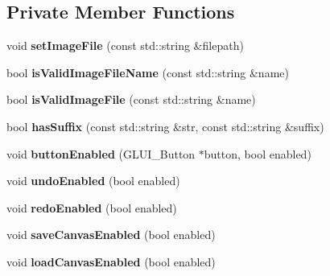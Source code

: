 \subsection*{Private Member Functions}
\begin{DoxyCompactItemize}
\item 
void {\bfseries set\+Image\+File} (const std\+::string \&filepath)\hypertarget{classFlashPhotoApp_a262d3fad41e5feb441b4ea431c65f8c1}{}\label{classFlashPhotoApp_a262d3fad41e5feb441b4ea431c65f8c1}

\item 
bool {\bfseries is\+Valid\+Image\+File\+Name} (const std\+::string \&name)\hypertarget{classFlashPhotoApp_a05fb136c74949eb11f07f161e18b0e44}{}\label{classFlashPhotoApp_a05fb136c74949eb11f07f161e18b0e44}

\item 
bool {\bfseries is\+Valid\+Image\+File} (const std\+::string \&name)\hypertarget{classFlashPhotoApp_af9f413e89445c3a0210e69d542affd67}{}\label{classFlashPhotoApp_af9f413e89445c3a0210e69d542affd67}

\item 
bool {\bfseries has\+Suffix} (const std\+::string \&str, const std\+::string \&suffix)\hypertarget{classFlashPhotoApp_a346a7760598d8dd3c6ddb0630b1e51b6}{}\label{classFlashPhotoApp_a346a7760598d8dd3c6ddb0630b1e51b6}

\item 
void {\bfseries button\+Enabled} (G\+L\+U\+I\+\_\+\+Button $\ast$button, bool enabled)\hypertarget{classFlashPhotoApp_a886a76eaa5e30c1708a96cc62cd98887}{}\label{classFlashPhotoApp_a886a76eaa5e30c1708a96cc62cd98887}

\item 
void {\bfseries undo\+Enabled} (bool enabled)\hypertarget{classFlashPhotoApp_aa4ceaa973c4cd8b953e4e09d0a5a81ff}{}\label{classFlashPhotoApp_aa4ceaa973c4cd8b953e4e09d0a5a81ff}

\item 
void {\bfseries redo\+Enabled} (bool enabled)\hypertarget{classFlashPhotoApp_a03e224580f502076a6c498a35fb8069f}{}\label{classFlashPhotoApp_a03e224580f502076a6c498a35fb8069f}

\item 
void {\bfseries save\+Canvas\+Enabled} (bool enabled)\hypertarget{classFlashPhotoApp_af370462c4a82dd932ae7364fc58e3959}{}\label{classFlashPhotoApp_af370462c4a82dd932ae7364fc58e3959}

\item 
void {\bfseries load\+Canvas\+Enabled} (bool enabled)\hypertarget{classFlashPhotoApp_aa04f2738fdb07a7eaa86f146c7537a70}{}\label{classFlashPhotoApp_aa04f2738fdb07a7eaa86f146c7537a70}


\end{DoxyCompactItemize}
